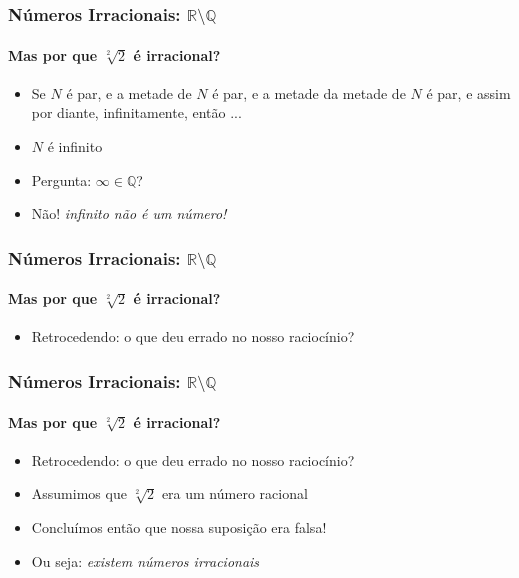 \documentclass[usenames,dvipsnames,svgnames]{beamer}
\begin{document}
\begin{frame}	
	\frametitle{Números Irracionais: $\mathbb{R} \setminus \mathbb{Q}$}
	\framesubtitle{Mas {\color{red}por que} $\sqrt[2]{2}$ é irracional?}

	\begin{itemize}
		\item Se $N$ é par, e a metade de $N$ é par, e a metade da metade de $N$ é par, e assim por diante, infinitamente, então ...
		\item $N$ é {\color{red} infinito}
		\item Pergunta: $\infty \in \mathbb{Q}$?
		\item {\color{red} Não! \emph{infinito não é um número!}}
	\end{itemize}
\end{frame}

\begin{frame}	
	\frametitle{Números Irracionais: $\mathbb{R} \setminus \mathbb{Q}$}
	\framesubtitle{Mas {\color{red}por que} $\sqrt[2]{2}$ é irracional?}

	\begin{itemize}
		\item Retrocedendo: o que deu errado no nosso raciocínio?
	\end{itemize}
\end{frame}

\begin{frame}	
	\frametitle{Números Irracionais: $\mathbb{R} \setminus \mathbb{Q}$}
	\framesubtitle{Mas {\color{red}por que} $\sqrt[2]{2}$ é irracional?}

	\begin{itemize}
		\item Retrocedendo: o que deu errado no nosso raciocínio?
		\item Assumimos que $\sqrt[2]{2}$ era um número racional
		\item Concluímos então que nossa suposição era falsa!
		\item Ou seja: \emph{existem números irracionais}
	\end{itemize}
\end{frame}
\end{document}
